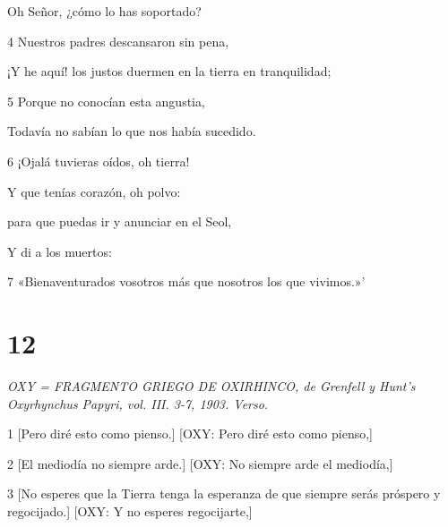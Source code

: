 \par Oh Señor, ¿cómo lo has soportado?

\par 4 Nuestros padres descansaron sin pena,

\par ¡Y he aquí! los justos duermen en la tierra en tranquilidad;

\par 5 Porque no conocían esta angustia,

\par Todavía no sabían lo que nos había sucedido.

\par 6 ¡Ojalá tuvieras oídos, oh tierra!

\par Y que tenías corazón, oh polvo:

\par para que puedas ir y anunciar en el Seol,

\par Y di a los muertos:

\par 7 «Bienaventurados vosotros más que nosotros los que vivimos.»'

\chapter{12}

\par \textit{OXY = FRAGMENTO GRIEGO DE OXIRHINCO, de Grenfell y Hunt's Oxyrhynchus Papyri, vol. III. 3-7, 1903. Verso.}

\par 1 [Pero diré esto como pienso.] [OXY: Pero diré esto como pienso,]

\par [Y hablaré contra ti, tierra que aún prospera.] [OXY: Y hablaré contra ti, tierra que prospera.]

\par 2 [El mediodía no siempre arde.] [OXY: No siempre arde el mediodía,]

\par [Ni los rayos del sol dan luz constantemente.] [OXY: Ni los rayos del sol dan luz constantemente.]

\par 3 [No esperes que la Tierra tenga la esperanza de que siempre serás próspero y regocijado.] [OXY: Y no esperes regocijarte,]

\par [Y no os envanezcáis ni os jactéis mucho.] [OXY: Ni condenéis mucho.]

